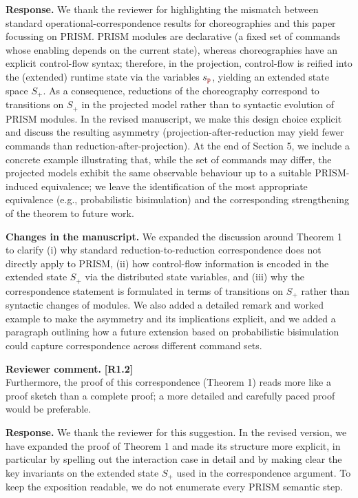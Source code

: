 \documentclass[11pt]{article}
\newcommand{\role}[1]{\textcolor{bloodyred}{\mathtt{#1}}}
\newcommand{\nr}{\role p}
\newcommand{\revcomment}[1]{%
  \begin{reviewercomment}
  \textbf{Reviewer comment.} #1
  \end{reviewercomment}
}
\newcommand{\revresponse}[2][]{%
  \par\noindent\textbf{Response.} #1 #2
}
\newcommand{\revchanges}[2][]{%
  \par\noindent\textbf{Changes in the manuscript.} #1
  #2\par\bigskip
}
\begin{document}
\revresponse{ We thank the reviewer for highlighting the mismatch
  between standard operational-correspondence results for
  choreographies and this paper focussing on PRISM.  PRISM modules are
  declarative (a fixed set of commands whose enabling depends on the
  current state), whereas choreographies have an explicit control-flow
  syntax; therefore, in the projection, control-flow is reified into
  the (extended) runtime state via the variables $s_{\nr}$, yielding
  an extended state space $S_+$. As a consequence, reductions of the
  choreography correspond to transitions on $S_+$ in the projected
  model rather than to syntactic evolution of PRISM modules.
%
  In the revised manuscript, we make this design choice explicit and
  discuss the resulting asymmetry (projection-after-reduction may
  yield fewer commands than reduction-after-projection). At the end of
  Section 5, we include a concrete example illustrating that, while
  the set of commands may differ, the projected models exhibit the
  same observable behaviour up to a suitable PRISM-induced
  equivalence; we leave the identification of the most appropriate
  equivalence (e.g., probabilistic bisimulation) and the corresponding
  strengthening of the theorem to future work.  }

\revchanges{ We expanded the discussion around Theorem 1 to clarify
  (i) why standard reduction-to-reduction correspondence does not
  directly apply to PRISM, (ii) how control-flow information is
  encoded in the extended state $S_+$ via the distributed state
  variables, and (iii) why the correspondence statement is formulated
  in terms of transitions on $S_+$ rather than syntactic changes of
  modules. We also added a detailed remark and worked example to make
  the asymmetry and its implications explicit, and we added a
  paragraph outlining how a future extension based on probabilistic
  bisimulation could capture correspondence across different command
  sets.  }

\revcomment{\textbf{[R1.2]}\\
Furthermore, the proof of this correspondence (Theorem 1) reads more
like a proof sketch than a complete proof; a more detailed and
carefully paced proof would be preferable.
}

\revresponse{ We thank the reviewer for this suggestion. In the
  revised version, we have expanded the proof of Theorem 1 and made
  its structure more explicit, in particular by spelling out the
  interaction case in detail and by making clear the key invariants on
  the extended state $S_+$ used in the correspondence argument. To
  keep the exposition readable, we do not enumerate every PRISM
  semantic step.  }
\end{document}
